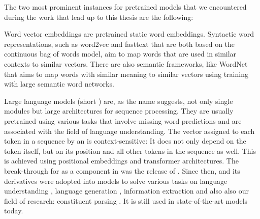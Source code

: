 \documentclass[../document.tex]{subfiles}
\begin{document}
    The two most prominent instances for pretrained models that we encountered during the work that lead up to this thesis are the following:
    \begin{compactitem}
        \item
            Word vector embeddings are pretrained static word embeddings.
            Syntactic word representations, such as word2vec \citep{word2vec} and fasttext \citep{fasttext} that are both based on the continuous bag of words model, aim to map words that are used in similar contexts to similar vectors.
            There are also semantic frameworks, like WordNet \citep{wordnet} that aims to map words with similar meaning to similar vectors using training with large semantic word networks.
        \item
            Large language models (short ) are, as the name suggests, not only single modules but large architectures for sequence processing.
            They are usually pretrained using various tasks that involve missing word predictions and are associated with the field of language understanding.
            The vector assigned to each token in a sequence by an  is context-sensitive:
                It does not only depend on the token itself, but on its position and all other tokens in the sequence as well.
                This is achieved using positional embeddings and transformer architectures.
            The break-through for  as a component in  was the release of . \citep{Devlin2019}
            Since then,  and its derivatives were adopted into models to solve various tasks on language understanding \citep[question answering, entailment recognition, sentiment analysis, i.a.]{Devlin2019, roberta}, language generation \citep[summarization, translation, i.a.]{bertgeneration}, information extraction \citep[named entity recognition, relation extraction]{biobert} and also also our field of research: constituent parsing \citep{Cor20, FerGom20a, FerGom22,Coa21, Sun22}.
            It is still used in state-of-the-art models today.
    \end{compactitem}

    \ifSubfilesClassLoaded{%
        \printindex
    }{}
\end{document}
